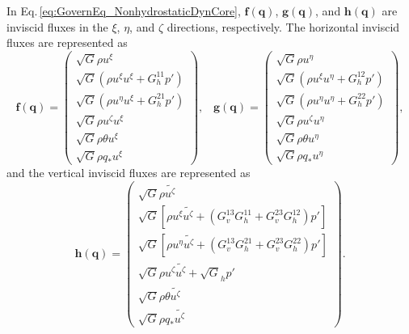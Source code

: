 In Eq.\,\eqref{eq:GovernEq_NonhydrostaticDynCore}, 
$\bm{f}(\bm{q})$, $\bm{g}(\bm{q})$, and $\bm{h}(\bm{q})$ are inviscid fluxes 
in the $\xi$, $\eta$, and $\zeta$ directions, respectively. 
The horizontal inviscid fluxes are represented as
\begin{equation}    
\bm{f}(\bm{q})
    =\begin{pmatrix}
    \sqrt{G} \rho u^\xi \\
    \sqrt{G} (\rho u^\xi u^\xi  + G^{11}_h p') \\
    \sqrt{G} (\rho u^\eta u^\xi  + G^{21}_h p') \\
    \sqrt{G} \rho u^\zeta u^\xi  \\
    \sqrt{G} \rho \theta u^\xi \\
    \sqrt{G} \rho q_* u^\xi 
    \end{pmatrix}, \;\;\;
\bm{g}(\bm{q})
    =\begin{pmatrix}
    \sqrt{G} \rho u^\eta \\
    \sqrt{G} (\rho u^\xi u^\eta  + G^{12}_h p') \\
    \sqrt{G} (\rho u^\eta u^\eta  + G^{22}_h p') \\
    \sqrt{G} \rho u^\zeta u^\eta  \\
    \sqrt{G} \rho \theta u^\eta \\
    \sqrt{G} \rho q_* u^\eta
    \end{pmatrix},
\label{eq:horizontal_invisflux}
\end{equation}
and the vertical inviscid fluxes are represented as
\begin{equation}   
\bm{h}(\bm{q})
    =\begin{pmatrix}
    \sqrt{G} \rho \widetilde{u^\zeta} \\
    \sqrt{G} [\rho u^\xi \widetilde{u^\zeta}  + (G^{13}_v G^{11}_h + G^{23}_v G^{12}_h) p'] \\
    \sqrt{G} [\rho u^\eta \widetilde{u^\zeta} + (G^{13}_v G^{21}_h + G^{23}_v G^{22}_h)  p'] \\
    \sqrt{G} \rho u^\zeta \widetilde{u^\zeta}  + \sqrt{G}_h p' \\
    \sqrt{G} \rho \theta \widetilde{u^\zeta} \\
    \sqrt{G} \rho q_* \widetilde{u^\zeta}
    \end{pmatrix}. 
\label{eq:vertical_invisflux}
\end{equation}


